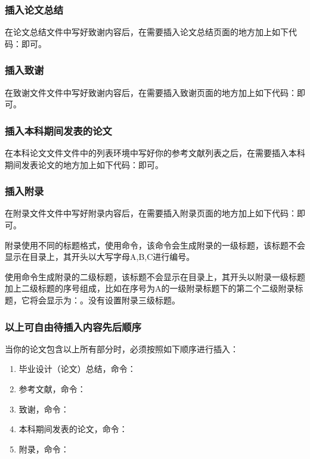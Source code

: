 \documentclass{nitthesis}
\begin{document}
\subsubsection{插入论文总结}

在论文总结文件中写好致谢内容后，在需要插入论文总结页面的地方加上如下代码：即可。

\subsubsection{插入致谢}

在致谢文件文件中写好致谢内容后，在需要插入致谢页面的地方加上如下代码：即可。

\subsubsection{插入本科期间发表的论文}

在本科论文文件文件中的列表环境中写好你的参考文献列表之后，在需要插入本科期间发表论文的地方加上如下代码：即可。

\subsubsection{插入附录}

在附录文件文件中写好附录内容后，在需要插入附录页面的地方加上如下代码：即可。

附录使用不同的标题格式，使用命令，该命令会生成附录的一级标题，该标题不会显示在目录上，其开头以大写字母A,B,C进行编号。

使用命令生成附录的二级标题，该标题不会显示在目录上，其开头以附录一级标题加上二级标题的序号组成，比如在序号为A的一级附录标题下的第二个二级附录标题，它将会显示为：。没有设置附录三级标题。

\subsubsection{以上可自由待插入内容先后顺序}

当你的论文包含以上所有部分时，必须按照如下顺序进行插入：

\begin{enumerate}
    \item 毕业设计（论文）总结，命令：
    \item 参考文献，命令：
    \item 致谢，命令：
    \item 本科期间发表的论文，命令：
    \item 附录，命令：
\end{enumerate}
\end{document}
